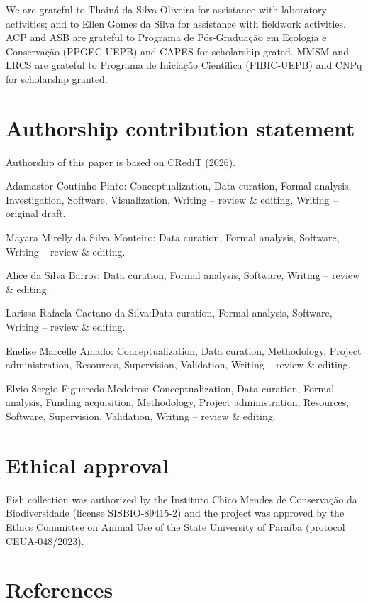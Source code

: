 \documentclass[
  american,
  letterpaper,
  DIV=11,
  numbers=noendperiod]{scrartcl}
\begin{document}
We are grateful to Thainá da Silva Oliveira for assistance with
laboratory activities; and to Ellen Gomes da Silva for assistance with
fieldwork activities. ACP and ASB are grateful to Programa de
Pós-Graduação em Ecologia e Conservação (PPGEC-UEPB) and CAPES for
scholarship grated. MMSM and LRCS are grateful to Programa de Iniciação
Científica (PIBIC-UEPB) and CNPq for scholarship granted.

\section*{Authorship contribution
statement}\label{authorship-contribution-statement}

Authorship of this paper is based on CRediT (2026).

Adamastor Coutinho Pinto: Conceptualization, Data curation, Formal
analysis, Investigation, Software, Visualization, Writing -- review \&
editing, Writing -- original draft.

Mayara Mirelly da Silva Monteiro: Data curation, Formal analysis,
Software, Writing -- review \& editing.

Alice da Silva Barros: Data curation, Formal analysis, Software, Writing
-- review \& editing.

Larissa Rafaela Caetano da Silva:Data curation, Formal analysis,
Software, Writing -- review \& editing.

Enelise Marcelle Amado: Conceptualization, Data curation, Methodology,
Project administration, Resources, Supervision, Validation, Writing --
review \& editing.

Elvio Sergio Figueredo Medeiros: Conceptualization, Data curation,
Formal analysis, Funding acquisition, Methodology, Project
administration, Resources, Software, Supervision, Validation, Writing --
review \& editing.

\section*{Ethical approval}\label{ethical-approval}

Fish collection was authorized by the Instituto Chico Mendes de
Conservação da Biodiversidade (license SISBIO-89415-2) and the project
was approved by the Ethics Committee on Animal Use of the State
University of Paraíba (protocol CEUA-048/2023).

\section*{References}\label{references}
\end{document}
